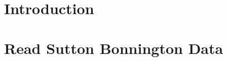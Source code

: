 \documentclass{article}
\title{\myTitleMainTitle}
\author{
    Dr Paul J. Palmer
   \\
    Wolfson School of Mechanical, Electrical and Manufacturing Engineering \\
    Loughborough University \\
  Leicestershire VC55 \\
  \texttt{\href{mailto:p.j.palmer@lboro.ac.uk}{\nolinkurl{p.j.palmer@lboro.ac.uk}}} \\
  }
\begin{document}
\maketitle

\def\tightlist{}


\begin{abstract}
\myAbstract
\end{abstract}


\hypertarget{introduction}{%
\section{Introduction}\label{introduction}}

\myTitleMainTitle

\hypertarget{read-sutton-bonnington-data}{%
\section{Read Sutton Bonnington Data}\label{read-sutton-bonnington-data}}
\end{document}
